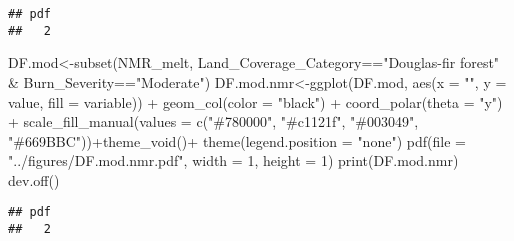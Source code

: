 \documentclass[
]{article}
\newenvironment{Shaded}{\begin{snugshade}}{\end{snugshade}}
\newcommand{\AttributeTok}[1]{\textcolor[rgb]{0.77,0.63,0.00}{#1}}
\newcommand{\DecValTok}[1]{\textcolor[rgb]{0.00,0.00,0.81}{#1}}
\newcommand{\FunctionTok}[1]{\textcolor[rgb]{0.00,0.00,0.00}{#1}}
\newcommand{\NormalTok}[1]{#1}
\newcommand{\OtherTok}[1]{\textcolor[rgb]{0.56,0.35,0.01}{#1}}
\newcommand{\SpecialCharTok}[1]{\textcolor[rgb]{0.00,0.00,0.00}{#1}}
\newcommand{\StringTok}[1]{\textcolor[rgb]{0.31,0.60,0.02}{#1}}
\begin{document}
\begin{verbatim}
## pdf 
##   2
\end{verbatim}

\begin{Shaded}
\begin{Highlighting}[]
\NormalTok{DF.mod}\OtherTok{\textless{}{-}}\FunctionTok{subset}\NormalTok{(NMR\_melt, Land\_Coverage\_Category}\SpecialCharTok{==}\StringTok{"Douglas{-}fir forest"} \SpecialCharTok{\&}\NormalTok{ Burn\_Severity}\SpecialCharTok{==}\StringTok{"Moderate"}\NormalTok{)}
\NormalTok{DF.mod.nmr}\OtherTok{\textless{}{-}}\FunctionTok{ggplot}\NormalTok{(DF.mod, }\FunctionTok{aes}\NormalTok{(}\AttributeTok{x =} \StringTok{""}\NormalTok{, }\AttributeTok{y =}\NormalTok{ value, }\AttributeTok{fill =}\NormalTok{ variable)) }\SpecialCharTok{+}
    \FunctionTok{geom\_col}\NormalTok{(}\AttributeTok{color =} \StringTok{"black"}\NormalTok{) }\SpecialCharTok{+}
    \FunctionTok{coord\_polar}\NormalTok{(}\AttributeTok{theta =} \StringTok{"y"}\NormalTok{) }\SpecialCharTok{+} \FunctionTok{scale\_fill\_manual}\NormalTok{(}\AttributeTok{values =} \FunctionTok{c}\NormalTok{(}\StringTok{"\#780000"}\NormalTok{, }\StringTok{"\#c1121f"}\NormalTok{, }\StringTok{"\#003049"}\NormalTok{, }\StringTok{"\#669BBC"}\NormalTok{))}\SpecialCharTok{+}\FunctionTok{theme\_void}\NormalTok{()}\SpecialCharTok{+}
    \FunctionTok{theme}\NormalTok{(}\AttributeTok{legend.position =} \StringTok{"none"}\NormalTok{)}
\FunctionTok{pdf}\NormalTok{(}\AttributeTok{file =} \StringTok{"../figures/DF.mod.nmr.pdf"}\NormalTok{, }\AttributeTok{width =} \DecValTok{1}\NormalTok{, }\AttributeTok{height =} \DecValTok{1}\NormalTok{) }
\FunctionTok{print}\NormalTok{(DF.mod.nmr)}
\FunctionTok{dev.off}\NormalTok{()}
\end{Highlighting}
\end{Shaded}

\begin{verbatim}
## pdf 
##   2
\end{verbatim}
\end{document}
